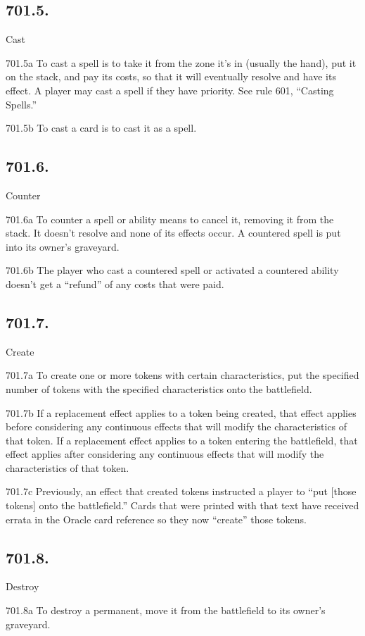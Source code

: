 \subsection*{701.5.}
Cast

701.5a To cast a spell is to take it from the zone it’s in (usually the hand), put it on the stack, and pay its costs, so that it will eventually resolve and have its effect. A player may cast a spell if they have priority. See rule 601, “Casting Spells.”

701.5b To cast a card is to cast it as a spell.

\subsection*{701.6.}
Counter

701.6a To counter a spell or ability means to cancel it, removing it from the stack. It doesn’t resolve and none of its effects occur. A countered spell is put into its owner’s graveyard.

701.6b The player who cast a countered spell or activated a countered ability doesn’t get a “refund” of any costs that were paid.

\subsection*{701.7.}
Create

701.7a To create one or more tokens with certain characteristics, put the specified number of tokens with the specified characteristics onto the battlefield.

701.7b If a replacement effect applies to a token being created, that effect applies before considering any continuous effects that will modify the characteristics of that token. If a replacement effect applies to a token entering the battlefield, that effect applies after considering any continuous effects that will modify the characteristics of that token.

701.7c Previously, an effect that created tokens instructed a player to “put [those tokens] onto the battlefield.” Cards that were printed with that text have received errata in the Oracle card reference so they now “create” those tokens.

\subsection*{701.8.}
Destroy

701.8a To destroy a permanent, move it from the battlefield to its owner’s graveyard.

